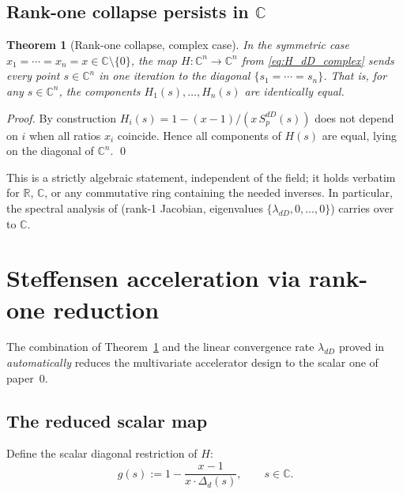 \documentclass[11pt,a4paper]{article}
\newtheorem{theorem}{Theorem}
\theoremstyle{definition}
\theoremstyle{remark}
\newcommand{\R}{\mathbb{R}}
\newcommand{\C}{\mathbb{C}}
\begin{document}
\subsection{Rank-one collapse persists in $\C$}

\begin{theorem}[Rank-one collapse, complex case]
\label{thm:rank1_complex}
In the symmetric case $x_1 = \cdots = x_n = x \in \C \setminus \{0\}$, the
map $H : \C^n \to \C^n$ from \eqref{eq:H_dD_complex} sends every point
$s \in \C^n$ in one iteration to the diagonal $\{s_1 = \cdots = s_n\}$.
That is, for any $s \in \C^n$, the components $H_1(s), \ldots, H_n(s)$ are
identically equal.
\end{theorem}

\begin{proof}
By construction $H_i(s) = 1 - (x-1)/(x \, S_p^{dD}(s))$ does not depend on
$i$ when all ratios $x_i$ coincide.  Hence all components of $H(s)$ are
equal, lying on the diagonal of $\C^n$. \qed
\end{proof}

This is a strictly algebraic statement, independent of the field;
it holds verbatim for $\R$, $\C$, or any commutative ring containing the
needed inverses.  In particular, the spectral analysis of
\cite{1pandrosion_dD} (rank-1 Jacobian, eigenvalues
$\{\lambda_{dD}, 0, \ldots, 0\}$) carries over to $\C$.

\section{Steffensen acceleration via rank-one reduction}

The combination of Theorem~\ref{thm:rank1_complex} and the linear
convergence rate $\lambda_{dD}$ proved in \cite{1pandrosion_dD}
\emph{automatically} reduces the multivariate accelerator design to the
scalar one of paper~0.

\subsection{The reduced scalar map}

Define the scalar diagonal restriction of $H$:
\begin{equation}
  \label{eq:g_scalar}
  g(s) := 1 - \frac{x - 1}{x \cdot \Delta_d(s)}, \qquad s \in \C.
\end{equation}
\end{document}
